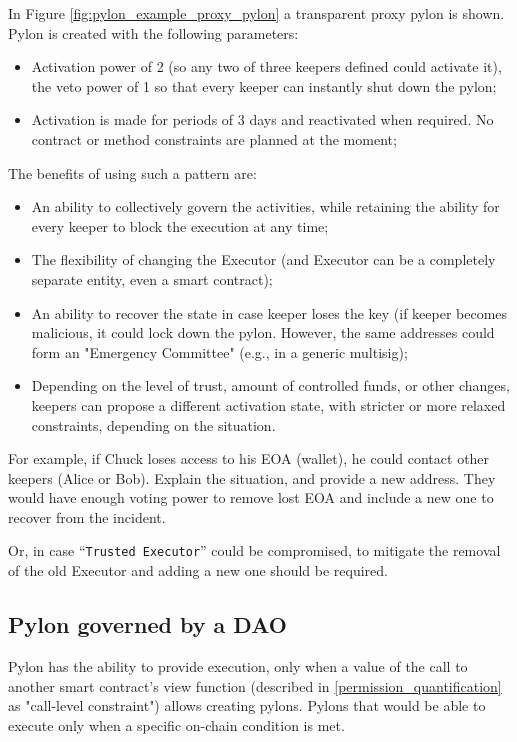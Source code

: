 \documentclass[12pt]{article}
\begin{document}
In Figure \ref{fig:pylon_example_proxy_pylon} a transparent proxy pylon is shown. Pylon is created with the following parameters:
\begin{itemize}
\item{Activation power of 2 (so any two of three keepers defined could activate it), the veto power of 1 so that every keeper can instantly shut down the pylon;}
\item{Activation is made for periods of 3 days and reactivated when required. No contract or method constraints are planned at the moment;}
\end{itemize}



\medskip
The benefits of using such a pattern are:
\begin{itemize}
\item{An ability to collectively govern the activities, while retaining the ability for every keeper to block the execution at any time;}
\item{The flexibility of changing the Executor (and Executor can be a completely separate entity, even a smart contract);}
\item{An ability to recover the state in case keeper loses the key (if keeper becomes malicious, it could lock down the pylon. However, the same addresses could form an "Emergency Committee" (e.g., in a generic multisig);}
\item{Depending on the level of trust, amount of controlled funds, or other changes, keepers can propose a different activation state, with stricter or more relaxed constraints, depending on the situation.}
\end{itemize}

For example, if Chuck loses access to his EOA (wallet), he could contact other keepers (Alice or Bob). Explain the situation, and provide a new address. They would have enough voting power to remove lost EOA and include a new one to recover from the incident.

Or, in case ``\texttt{Trusted Executor}'' could be compromised, to mitigate the removal of the old Executor and adding a new one should be required.

\pagebreak
\subsection{Pylon governed by a DAO}

Pylon has the ability to provide execution, only when a value of the call to another smart contract’s view function (described in \ref{permission_quantification} as "call-level constraint") allows creating pylons. Pylons that would be able to execute only when a specific on-chain condition is met.
\end{document}

